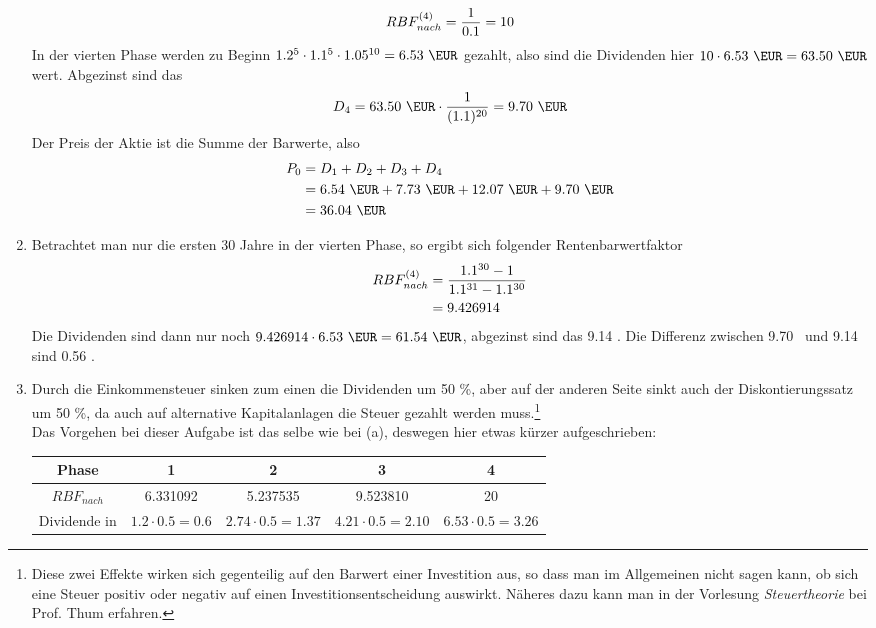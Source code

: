 \documentclass{article}
\begin{document}
\begin{enumerate}[label=(\alph*)]
\begin{align}
			RBF_{nach}^{(4)} = \frac{1}{0.1} = 10 \notag
		\end{align}
		In der vierten Phase werden zu Beginn $1.2^5\cdot 1.1^5\cdot 1.05^{10} = 6.53\text{ \EUR}$ gezahlt, also sind die Dividenden hier $10\cdot 6.53\text{ \EUR} = 63.50 \text{ \EUR}$ wert. Abgezinst sind das
		\begin{align}
			D_4 = 63.50\text{ \EUR} \cdot\frac{1}{(1.1)^{20}} = 9.70\text{ \EUR} \notag
		\end{align}
		Der Preis der Aktie ist die Summe der Barwerte, also
		\begin{align}
			P_0 &= D_1 + D_2 + D_3 + D_4 \notag \\
			&= 6.54 \text{ \EUR} + 7.73 \text{ \EUR} + 12.07\text{ \EUR} + 9.70\text{ \EUR} \notag \\
			&= 36.04 \text{ \EUR} \notag
		\end{align}
		\item Betrachtet man nur die ersten 30 Jahre in der vierten Phase, so ergibt sich folgender Rentenbarwertfaktor
		\begin{align}
			RBF_{nach}^{(4)} &= \frac{1.1^{30}-1}{1.1^{31} - 1.1^{30}} \notag \\
			&= 9.426914 \notag
		\end{align}
		Die Dividenden sind dann nur noch $9.426914\cdot 6.53\text{ \EUR} = 61.54 \text{ \EUR}$, abgezinst sind das 9.14 \EUR. Die Differenz zwischen 9.70 \EUR\, und 9.14 \EUR\, sind 0.56 \EUR.
		\item Durch die Einkommensteuer sinken zum einen die Dividenden um 50 \%, aber auf der anderen Seite sinkt auch der Diskontierungssatz um 50 \%, da auch auf alternative Kapitalanlagen die Steuer gezahlt werden muss.\footnote{Diese zwei Effekte wirken sich gegenteilig auf den Barwert einer Investition aus, so dass man im Allgemeinen nicht sagen kann, ob sich eine Steuer positiv oder negativ auf einen Investitionsentscheidung auswirkt. Näheres dazu kann man in der Vorlesung \textit{Steuertheorie} bei Prof. Thum erfahren.} \\
		Das Vorgehen bei dieser Aufgabe ist das selbe wie bei (a), deswegen hier etwas kürzer aufgeschrieben:
		\begin{center}
			\begin{tabular}{c|c|c|c|c}
				\textbf{Phase} & \textbf{1} & \textbf{2} & \textbf{3} & \textbf{4} \\
				\hline
				$RBF_{nach}$ & 6.331092 & 5.237535 & 9.523810 & 20 \\
				Dividende in \EUR & $1.2\cdot 0.5 = 0.6$ & $2.74\cdot 0.5=1.37$ & $4.21\cdot 0.5=2.10$ & $6.53\cdot 0.5=3.26$ \\

\end{tabular}
\end{center}
\end{enumerate}
\end{document}
